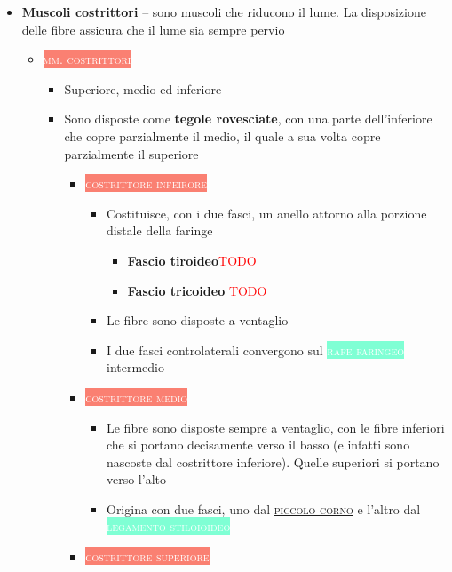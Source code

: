 \documentclass[italian,]{article}
\providecommand{\tightlist}{%
  \setlength{\itemsep}{0pt}\setlength{\parskip}{0pt}}
\newcommand{\mus}[1]{\colorbox{Salmon}{\textcolor{white}{\textsc{#1}}}}
\newcommand{\tol}[1]{\colorbox{Aquamarine}{\textcolor{white}{\textsc{#1}}}}
\renewcommand{\a}[1]{\underline{\textsc{#1}}}
\newcommand{\TODO}[1]{\textcolor{red}{\textsf{\footnotesize{TODO #1}}}} %
\begin{document}
\begin{itemize}
\tightlist
\item
  \textbf{Muscoli costrittori} -- sono muscoli che riducono il lume. La
  disposizione delle fibre assicura che il lume sia sempre pervio

  \begin{itemize}
  \tightlist
  \item
    \mus{mm. costrittori}~

    \begin{itemize}
    \tightlist
    \item
      Superiore, medio ed inferiore
    \item
      Sono disposte come \textbf{tegole rovesciate}, con una parte
      dell'inferiore che copre parzialmente il medio, il quale a sua
      volta copre parzialmente il superiore

      \begin{itemize}
      \item
        \mus{costrittore infeirore}~

        \begin{itemize}
        \tightlist
        \item
          Costituisce, con i due fasci, un anello attorno alla porzione
          distale della faringe

          \begin{itemize}
          \tightlist
          \item
            \textbf{Fascio tiroideo}\TODO{}
          \item
            \textbf{Fascio tricoideo} \TODO{}
          \end{itemize}
        \item
          Le fibre sono disposte a ventaglio
        \item
          I due fasci controlaterali convergono sul \tol{rafe faringeo}
          intermedio
        \end{itemize}
      \item
        \mus{costrittore medio}~

        \begin{itemize}
        \tightlist
        \item
          Le fibre sono disposte sempre a ventaglio, con le fibre
          inferiori che si portano decisamente verso il basso (e infatti
          sono nascoste dal costrittore inferiore). Quelle superiori si
          portano verso l'alto
        \item
          Origina con due fasci, uno dal \a{piccolo corno} e l'altro dal
          \tol{legamento stiloioideo}
        \end{itemize}
      \item
        \mus{costrittore superiore}


\end{itemize}
\end{itemize}
\end{itemize}
\end{itemize}
\end{document}
